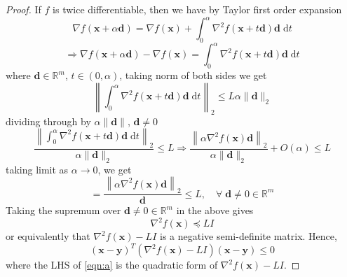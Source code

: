 \documentclass[12pt]{report}
\numberwithin{equation}{section}
\begin{document}
\begin{proof}
If $f$ is twice differentiable, then we have by Taylor first order expansion 
\[
\nabla f(\bm{x}+\alpha \bm{d})=\nabla f(\bm{x})+\int_{0}^{\alpha} \nabla^{2} f(\bm{x}+t \bm{d}) \bm{d}\;\mathrm{d}t
\]
\[
\Longrightarrow \nabla f(\bm{x}+\alpha \bm{d})-\nabla f(\bm{x})=\int_{0}^{\alpha} \nabla^{2} f(\bm{x}+t \bm{d}) \bm{d}\;\mathrm{d}t
\]
where $\bm{d} \in \mathbb{R}^m$, $t\in(0,\alpha)$, taking norm of both sides we get
\[
\left\|\int_{0}^{\alpha} \nabla^{2} f(\bm{x}+t \bm{d}) \bm{d}\;\mathrm{d}t\right\|_{2} \leq L \alpha\|\bm{d}\|_{2}
\]
dividing through by $\alpha\|\bm{d}\|$, $\bm{d}\neq 0$ 
\[
\frac{\left\|\int_{0}^{\alpha} \nabla^{2} f(\bm{x}+t \bm{d}) \bm{d} \;\mathrm{d}t\right\|_{2}}{\alpha\|\bm{d}\|_2} \leq L \Longrightarrow \frac{\left\|\alpha \nabla^{2} f(\bm{x}) \bm{d}\right\|_{2}}{\alpha\|\bm{d}\|_2}+O(\alpha) \leq L
\]
taking limit as $\alpha \rightarrow 0$, we get 
\[
= \frac{\left\|\alpha \nabla^{2} f(\bm{x}) \bm{d}\right\|_{2}}{\bm{d}} \leq L, \quad \forall \;\bm{d} \neq 0 \in \mathbb{R}^{m}
\]
Taking the supremum over $\bm{d} \neq 0 \in \mathbb{R}^{m}$ in the above gives
\begin{equation}
\nabla^{2} f(\bm{x}) \preceq L I
\end{equation}
or equivalently that $\nabla^{2} f(\bm{x})-L I$ is a negative semi-definite matrix. Hence, 
\begin{equation}\label{eqn:a}
(\bm{x} - \bm{y})^T (\nabla^{2} f(\bm{x})-L I) (\bm{x} - \bm{y}) \leq 0
\end{equation}
where the LHS of \eqref{eqn:a} is the quadratic form of $\nabla^{2} f(\bm{x})-L I$.


\end{proof}
\end{document}
